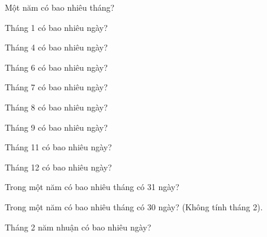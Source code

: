 \begin{ex}
Một năm có bao nhiêu tháng?
\end{ex}

\begin{ex}
Tháng 1 có bao nhiêu ngày?
\end{ex}

\begin{ex}
Tháng 4 có bao nhiêu ngày?
\end{ex}

\begin{ex}
Tháng 6 có bao nhiêu ngày?
\end{ex}

\begin{ex}
Tháng 7 có bao nhiêu ngày?
\end{ex}

\begin{ex}
Tháng 8 có bao nhiêu ngày?
\end{ex}

\begin{ex}
Tháng 9 có bao nhiêu ngày?
\end{ex}

\begin{ex}
Tháng 11 có bao nhiêu ngày?
\end{ex}

\begin{ex}
Tháng 12 có bao nhiêu ngày?
\end{ex}

\begin{ex}
Trong một năm có bao nhiêu tháng có 31 ngày?
\end{ex}

\begin{ex}
Trong một năm có bao nhiêu tháng có 30 ngày? (Không tính tháng 2).
\end{ex}

\begin{ex}
Tháng 2 năm nhuận có bao nhiêu ngày?
\end{ex}

